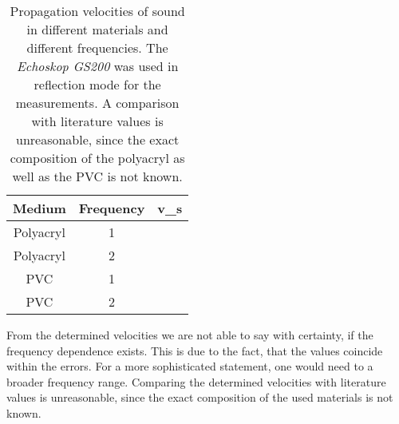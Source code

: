 \documentclass[a4paper,10pt,twocolumn]{article}
\begin{document}
    \begin{table}[htbp]          %
        \centering
        \begin{tabular*}{0.9\linewidth}{@{\extracolsep{\fill}}ccc}
            \hline
            \hline
            \rule[-7pt]{0pt}{23pt} Medium & Frequency  &  v_s 	 \\
            \hline
            \rule[-5pt]{0pt}{23pt}   Polyacryl & 1   &  \polyVelocityRuntimeMeasurementsOneMHz   	 \\
            \rule[-5pt]{0pt}{23pt}   Polyacryl & 2   & \polyVelocityRuntimeMeasurementsTwoMHz    	 \\
            \rule[-5pt]{0pt}{23pt}   PVC & 1  &   \PVCVelocityRuntimeMeasurementsOneMHz  	 \\
            \rule[-5pt]{0pt}{23pt}   PVC  & 2 &   \PVCVelocityRuntimeMeasurementsTwoMHz 	 \\
            \hline
            \hline
        \end{tabular*}
        \normalsize
        \caption[]{Propagation velocities of sound in different materials and different frequencies.
        The \textit{Echoskop GS200} was used in reflection mode for the measurements. A comparison with literature values is unreasonable, since
        the exact composition of the polyacryl as well as the PVC is not known.}  %
        \label{tab:FittedExponent}                             %
    \end{table}
    From the determined velocities we are not able to say with certainty, if the frequency dependence exists.
    This is due to the fact, that the values coincide within the errors.
    For a more sophisticated statement, one would need to a broader frequency range.
    Comparing the determined velocities with literature values is unreasonable, since the exact composition of the used materials is not known.
    
\end{document}
